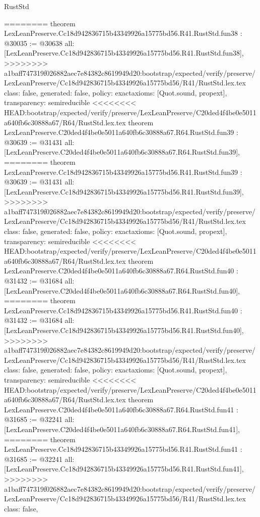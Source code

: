 \begin{lexlean}{RustStd}
\begin{coremodule}
{\begin{coremodule}
{{{{{{{{{{{{{{{{{{{{{{{{{{{{{{{{{{{{{{{{{========
theorem LexLeanPreserve.Cc18d942836715b43349926a15775bd56.R41.RustStd.fun38 : @30035 := @30638 {
  all: [LexLeanPreserve.Cc18d942836715b43349926a15775bd56.R41.RustStd.fun38],
>>>>>>>> a1baff747319f026882aec7e84382c8619949d20:bootstrap/expected/verify/preserve/LexLeanPreserve/Cc18d942836715b43349926a15775bd56/R41/RustStd.lex.tex
  class: false,
  generated: false,
  policy: exact{axioms: [Quot.sound, propext]},
  transparency: semireducible
}
<<<<<<<< HEAD:bootstrap/expected/verify/preserve/LexLeanPreserve/C20ded4f4be0e5011a640fb6c30888a67/R64/RustStd.lex.tex
theorem LexLeanPreserve.C20ded4f4be0e5011a640fb6c30888a67.R64.RustStd.fun39 : @30639 := @31431 {
  all: [LexLeanPreserve.C20ded4f4be0e5011a640fb6c30888a67.R64.RustStd.fun39],
========
theorem LexLeanPreserve.Cc18d942836715b43349926a15775bd56.R41.RustStd.fun39 : @30639 := @31431 {
  all: [LexLeanPreserve.Cc18d942836715b43349926a15775bd56.R41.RustStd.fun39],
>>>>>>>> a1baff747319f026882aec7e84382c8619949d20:bootstrap/expected/verify/preserve/LexLeanPreserve/Cc18d942836715b43349926a15775bd56/R41/RustStd.lex.tex
  class: false,
  generated: false,
  policy: exact{axioms: [Quot.sound, propext]},
  transparency: semireducible
}
<<<<<<<< HEAD:bootstrap/expected/verify/preserve/LexLeanPreserve/C20ded4f4be0e5011a640fb6c30888a67/R64/RustStd.lex.tex
theorem LexLeanPreserve.C20ded4f4be0e5011a640fb6c30888a67.R64.RustStd.fun40 : @31432 := @31684 {
  all: [LexLeanPreserve.C20ded4f4be0e5011a640fb6c30888a67.R64.RustStd.fun40],
========
theorem LexLeanPreserve.Cc18d942836715b43349926a15775bd56.R41.RustStd.fun40 : @31432 := @31684 {
  all: [LexLeanPreserve.Cc18d942836715b43349926a15775bd56.R41.RustStd.fun40],
>>>>>>>> a1baff747319f026882aec7e84382c8619949d20:bootstrap/expected/verify/preserve/LexLeanPreserve/Cc18d942836715b43349926a15775bd56/R41/RustStd.lex.tex
  class: false,
  generated: false,
  policy: exact{axioms: [Quot.sound, propext]},
  transparency: semireducible
}
<<<<<<<< HEAD:bootstrap/expected/verify/preserve/LexLeanPreserve/C20ded4f4be0e5011a640fb6c30888a67/R64/RustStd.lex.tex
theorem LexLeanPreserve.C20ded4f4be0e5011a640fb6c30888a67.R64.RustStd.fun41 : @31685 := @32241 {
  all: [LexLeanPreserve.C20ded4f4be0e5011a640fb6c30888a67.R64.RustStd.fun41],
========
theorem LexLeanPreserve.Cc18d942836715b43349926a15775bd56.R41.RustStd.fun41 : @31685 := @32241 {
  all: [LexLeanPreserve.Cc18d942836715b43349926a15775bd56.R41.RustStd.fun41],
>>>>>>>> a1baff747319f026882aec7e84382c8619949d20:bootstrap/expected/verify/preserve/LexLeanPreserve/Cc18d942836715b43349926a15775bd56/R41/RustStd.lex.tex
  class: false,
}}}}}}}}}}}}}}}}}}}}}}}}}}}}}}}}}}}}}}}}}}}}}
\end{coremodule}}
\end{coremodule}
\end{lexlean}
